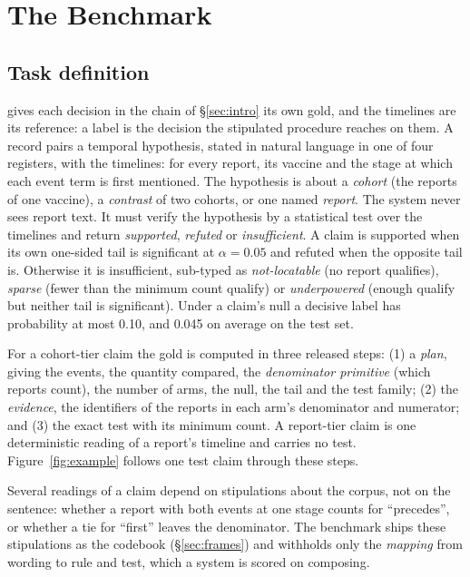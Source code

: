 \section{The \sys{} Benchmark}
\label{sec:dataset}

\subsection{Task definition}
\label{sec:task}

\sys{} gives each decision in the chain of \S\ref{sec:intro} its own gold, and
the timelines are its reference: a label is the decision the stipulated
procedure reaches on them. A record pairs a
temporal hypothesis, stated in natural language in one of four registers,
with the timelines: for every report, its vaccine and the stage at which
each event term is first mentioned. The hypothesis is about a \emph{cohort}
(the reports of one vaccine), a \emph{contrast} of two cohorts, or one named
\emph{report}. The system never sees report text. It must verify the
hypothesis by a statistical test over the timelines and return
\emph{supported}, \emph{refuted} or \emph{insufficient}. A claim is
supported when its own one-sided tail is significant at $\alpha = 0.05$ and
refuted when the opposite tail is. Otherwise it is insufficient, sub-typed
as \emph{not-locatable} (no report qualifies), \emph{sparse} (fewer than the
minimum count qualify) or \emph{underpowered} (enough qualify but neither
tail is significant). Under a claim's null a decisive
label has probability at most 0.10, and 0.045 on average on the test set.

For a cohort-tier claim the gold is computed in three released steps: (1) a
\emph{plan}, giving the events, the quantity compared, the \emph{denominator
primitive} (which reports count), the number of arms, the null, the tail and
the test family; (2) the \emph{evidence}, the identifiers of the reports in
each arm's denominator and numerator; and (3) the exact test with its minimum
count. A report-tier claim is one deterministic reading of a report's timeline
and carries no test. Figure~\ref{fig:example} follows one test claim through
these steps.

Several readings of a claim depend on stipulations about the corpus, not
on the sentence: whether a report with both events at one stage counts for
``precedes'', or whether a tie for ``first'' leaves the denominator. The
benchmark ships these stipulations as the codebook (\S\ref{sec:frames}) and
withholds only the \emph{mapping} from wording to rule and test, which a
system is scored on composing.


